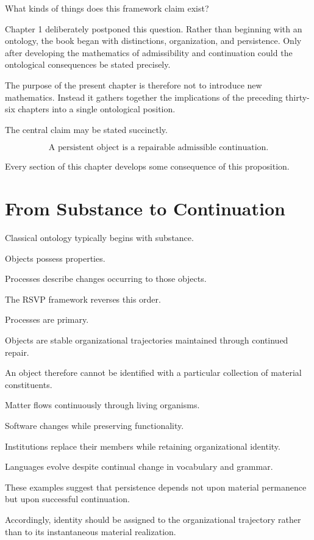 \documentclass[11pt,oneside]{book}
\numberwithin{equation}{chapter}
\theoremstyle{definition}
\theoremstyle{plain}
\begin{document}
What kinds of things does this framework claim exist?

Chapter 1 deliberately postponed this question. Rather than beginning with
an ontology, the book began with distinctions, organization, and
persistence. Only after developing the mathematics of admissibility and
continuation could the ontological consequences be stated precisely.

The purpose of the present chapter is therefore not to introduce new
mathematics. Instead it gathers together the implications of the preceding
thirty-six chapters into a single ontological position.

The central claim may be stated succinctly.

\[
\boxed{
\text{A persistent object is a repairable admissible continuation.}
}
\]

Every section of this chapter develops some consequence of this
proposition.

\section{From Substance to Continuation}

Classical ontology typically begins with substance.

Objects possess properties.

Processes describe changes occurring to those objects.

The RSVP framework reverses this order.

Processes are primary.

Objects are stable organizational trajectories maintained through continued
repair.

An object therefore cannot be identified with a particular collection of
material constituents.

Matter flows continuously through living organisms.

Software changes while preserving functionality.

Institutions replace their members while retaining organizational identity.

Languages evolve despite continual change in vocabulary and grammar.

These examples suggest that persistence depends not upon material
permanence but upon successful continuation.

Accordingly, identity should be assigned to the organizational trajectory
rather than to its instantaneous material realization.
\end{document}
